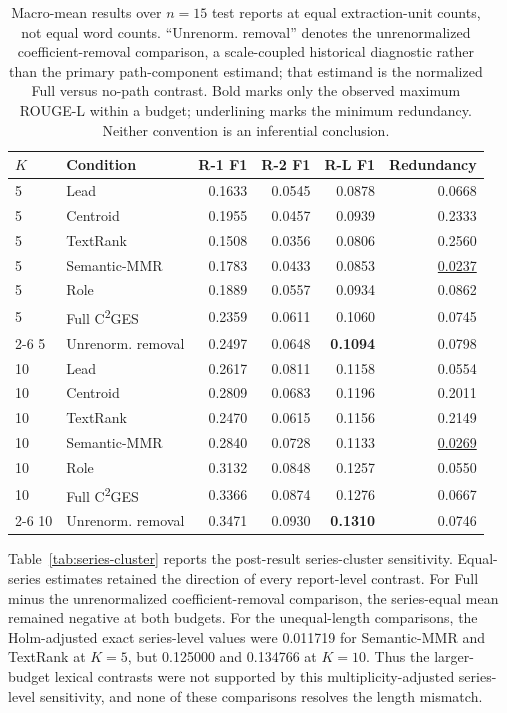 \documentclass[information,article,submit,moreauthors]{Definitions/mdpi}
\newcommand{\cges}{C\textsuperscript{2}GES}
\begin{document}
\begin{table}[H]
\caption{Macro-mean results over $n=15$ test reports at equal extraction-unit counts, not equal word counts. ``Unrenorm. removal'' denotes the unrenormalized coefficient-removal comparison, a scale-coupled historical diagnostic rather than the primary path-component estimand; that estimand is the normalized Full versus no-path contrast. Bold marks only the observed maximum ROUGE-L within a budget; underlining marks the minimum redundancy. Neither convention is an inferential conclusion.}
\label{tab:all-results}\centering\small
\begin{tabular}{llrrrr}
\toprule
$K$ & Condition & R-1 F1 & R-2 F1 & R-L F1 & Redundancy\\
\midrule
5 & Lead & 0.1633 & 0.0545 & 0.0878 & 0.0668\\
5 & Centroid & 0.1955 & 0.0457 & 0.0939 & 0.2333\\
5 & TextRank & 0.1508 & 0.0356 & 0.0806 & 0.2560\\
5 & Semantic-MMR & 0.1783 & 0.0433 & 0.0853 & \underline{0.0237}\\
5 & Role & 0.1889 & 0.0557 & 0.0934 & 0.0862\\
5 & Full \cges{} & 0.2359 & 0.0611 & 0.1060 & 0.0745\\
\cmidrule(lr){2-6}
5 & Unrenorm. removal & 0.2497 & 0.0648 & \textbf{0.1094} & 0.0798\\
\midrule
10 & Lead & 0.2617 & 0.0811 & 0.1158 & 0.0554\\
10 & Centroid & 0.2809 & 0.0683 & 0.1196 & 0.2011\\
10 & TextRank & 0.2470 & 0.0615 & 0.1156 & 0.2149\\
10 & Semantic-MMR & 0.2840 & 0.0728 & 0.1133 & \underline{0.0269}\\
10 & Role & 0.3132 & 0.0848 & 0.1257 & 0.0550\\
10 & Full \cges{} & 0.3366 & 0.0874 & 0.1276 & 0.0667\\
\cmidrule(lr){2-6}
10 & Unrenorm. removal & 0.3471 & 0.0930 & \textbf{0.1310} & 0.0746\\
\bottomrule
\end{tabular}
\end{table}

Table~\ref{tab:series-cluster} reports the post-result series-cluster sensitivity. Equal-series estimates retained the direction of every report-level contrast. For Full minus the unrenormalized coefficient-removal comparison, the series-equal mean remained negative at both budgets. For the unequal-length comparisons, the Holm-adjusted exact series-level values were 0.011719 for Semantic-MMR and TextRank at $K=5$, but 0.125000 and 0.134766 at $K=10$. Thus the larger-budget lexical contrasts were not supported by this multiplicity-adjusted series-level sensitivity, and none of these comparisons resolves the length mismatch.
\end{document}

